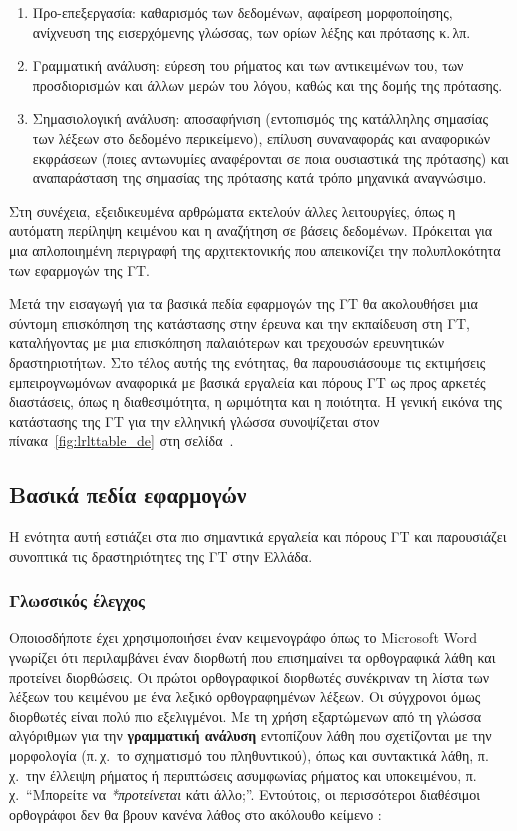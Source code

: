 \begin{multicols}{2}
\begin{enumerate}
\item Προ-επεξεργασία: καθαρισμός των δεδομένων, αφαίρεση μορφοποίησης, ανίχνευση της εισερχόμενης γλώσσας, των ορίων λέξης και πρότασης κ.\,λπ.
\item Γραμματική ανάλυση: εύρεση του ρήματος και των αντικειμένων του, των προσδιορισμών και άλλων μερών του λόγου,  καθώς και της δομής της πρότασης.
\item Σημασιολογική ανάλυση: αποσαφήνιση (εντοπισμός της κατάλληλης σημασίας των λέξεων στο δεδομένο περικείμενο), επίλυση συναναφοράς και αναφορικών εκφράσεων (ποιες αντωνυμίες αναφέρονται σε ποια ουσιαστικά της πρότασης) και αναπαράσταση της σημασίας της πρότασης κατά τρόπο μηχανικά αναγνώσιμο.
\end{enumerate}

Στη συνέχεια, εξειδικευμένα αρθρώματα εκτελούν άλλες λειτουργίες, όπως η αυτόματη περίληψη κειμένου και η αναζήτηση σε βάσεις δεδομένων. Πρόκειται για μια απλοποιημένη περιγραφή της αρχιτεκτονικής που απεικονίζει την πολυπλοκότητα των εφαρμογών της ΓΤ. 

Μετά την εισαγωγή για τα βασικά πεδία εφαρμογών της ΓΤ θα ακολουθήσει μια σύντομη επισκόπηση της κατάστασης στην έρευνα και την εκπαίδευση στη ΓΤ, καταλήγοντας με μια επισκόπηση παλαιότερων και τρεχουσών ερευνητικών δραστηριοτήτων. Στο τέλος αυτής της ενότητας, θα παρουσιάσουμε τις εκτιμήσεις εμπειρογνωμόνων αναφορικά με βασικά εργαλεία και πόρους ΓΤ ως προς αρκετές διαστάσεις, όπως η διαθεσιμότητα, η ωριμότητα και η ποιότητα. Η γενική εικόνα της κατάστασης της ΓΤ για την ελληνική γλώσσα συνοψίζεται στον πίνακα~\ref{fig:lrlttable_de} στη σελίδα~\pageref{fig:lrlttable_de}.

\subsection{Βασικά πεδία εφαρμογών} 

Η ενότητα αυτή εστιάζει στα πιο σημαντικά εργαλεία και πόρους ΓΤ και παρουσιάζει συνοπτικά τις δραστηριότητες της ΓΤ στην Ελλάδα. 

\subsubsection{Γλωσσικός έλεγχος}

Οποιοσδήποτε έχει χρησιμοποιήσει έναν κειμενογράφο όπως το Microsoft Word γνωρίζει ότι περιλαμβάνει έναν διορθωτή που επισημαίνει τα ορθογραφικά λάθη και προτείνει διορθώσεις. Οι πρώτοι ορθογραφικοί διορθωτές συνέκριναν τη λίστα των λέξεων του κειμένου με ένα λεξικό ορθογραφημένων λέξεων. Οι σύγχρονοι όμως διορθωτές είναι πολύ πιο εξελιγμένοι.  Με τη χρήση εξαρτώμενων από τη γλώσσα αλγόριθμων για την \textbf{γραμματική ανάλυση} εντοπίζουν λάθη που σχετίζονται με την μορφολογία (π.\,χ.~το σχηματισμό του πληθυντικού), όπως και συντακτικά λάθη, π.\,χ.~την έλλειψη ρήματος ή περιπτώσεις ασυμφωνίας ρήματος και υποκειμένου, π.\,χ.~“Μπορείτε να \textit{*προτείνεται} κάτι άλλο;”. Εντούτοις, οι περισσότεροι διαθέσιμοι ορθογράφοι δεν θα βρουν κανένα λάθος στο ακόλουθο κείμενο \cite{zar1}:


\end{multicols}
